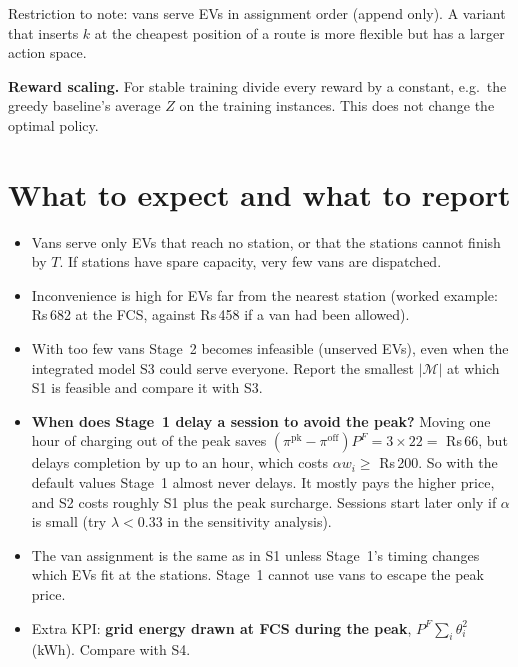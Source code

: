 \documentclass[11pt,a4paper]{article}
\newcommand{\M}{\mathcal{M}}
\newcommand{\pk}{\mathrm{pk}}
\newcommand{\off}{\mathrm{off}}
\begin{document}
Restriction to note: vans serve EVs in assignment order (append only). A variant that inserts $k$ at the cheapest position of a route is more flexible but has a larger action space.
\fi

\textbf{Reward scaling.} For stable training divide every reward by a constant, e.g.\ the greedy baseline's average $Z$ on the training instances. This does not change the optimal policy.

\section{What to expect and what to report}\label{sec:expect}

\ifnum{}
\begin{itemize}[leftmargin=1.4em,itemsep=2pt]
  \item Vans serve only EVs that reach no station, or that the stations cannot finish by $T$. If stations have spare capacity, very few vans are dispatched.
  \item Inconvenience is high for EVs far from the nearest station (worked example: Rs\,682 at the FCS, against Rs\,458 if a van had been allowed).
  \item With too few vans Stage~2 becomes infeasible (unserved EVs), even when the integrated model S3 could serve everyone. Report the smallest $|\M|$ at which S1 is feasible and compare it with S3.
\end{itemize}
\fi
\ifnum{}
\begin{itemize}[leftmargin=1.4em,itemsep=2pt]
  \item \textbf{When does Stage~1 delay a session to avoid the peak?} Moving one hour of charging out of the peak saves $(\pi^\pk-\pi^\off)P^F=3\times22=$ Rs\,66, but delays completion by up to an hour, which costs $\alpha w_i\ge$ Rs\,200. So with the default values Stage~1 almost never delays. It mostly pays the higher price, and S2 costs roughly S1 plus the peak surcharge. Sessions start later only if $\alpha$ is small (try $\lambda<0.33$ in the sensitivity analysis).
  \item The van assignment is the same as in S1 unless Stage~1's timing changes which EVs fit at the stations. Stage~1 cannot use vans to escape the peak price.
  \item Extra KPI: \textbf{grid energy drawn at FCS during the peak}, $P^F\sum_i\theta^2_i$ (kWh). Compare with S4.
\end{itemize}
\fi
\end{document}
